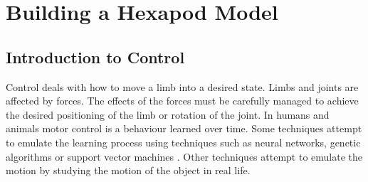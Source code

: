\chapter{Building a Hexapod Model}

\section{Introduction to Control}
Control deals with how to move a limb into a desired state. Limbs and joints are
affected by forces. The effects of the forces must be carefully managed to
achieve the desired positioning of the limb or rotation of the joint. In humans
and animals motor control is a behaviour learned over time. Some techniques
attempt to emulate the learning process using techniques such as neural
networks, genetic algorithms or support vector machines
\cite{FaloutsosvandePanneTerzopolous, RusselSmith, Sims}. Other techniques attempt to
emulate the motion by studying the motion of the object in real life. 

